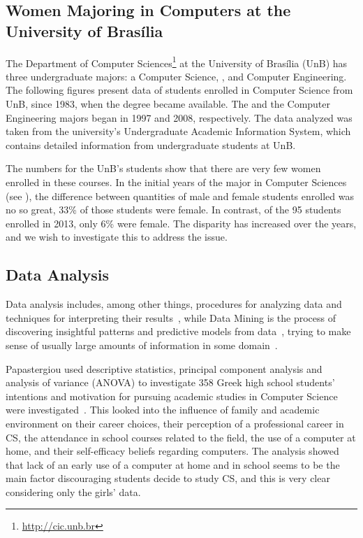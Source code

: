 \subsection{Women Majoring in Computers at the University of Brasília}

The Department of Computer Sciences\footnote{\url{http://cic.unb.br}} at the University of Brasília (UnB) has three undergraduate majors: a Computer Science, , and Computer Engineering. The following figures present data of students enrolled in Computer Science  from UnB, since 1983, when the degree became available. The   and the Computer Engineering majors  began in 1997 and 2008, respectively. The data analyzed was taken from the university's Undergraduate Academic Information System, which contains detailed information from undergraduate students at UnB.

The numbers for the UnB's students show that there are very few women enrolled in these courses. In the initial years of the major in Computer Sciences (see ), the difference between quantities of male and female students enrolled was no so great, 33\% of those students were female. In contrast, of the 95 students enrolled in 2013, only 6\% were female. The disparity has increased over the years, and we wish to investigate this to address the issue.

\subsection{Data Analysis}\label{sec:background:related}%

Data analysis includes, among other things, procedures for analyzing data and techniques for interpreting their results~\cite{Tukey1962}, while Data Mining is the process of discovering insightful patterns and predictive models from data~\cite{Zaki2014}, trying to make sense of usually large amounts of information in some domain~\cite{Cios2007}. 

Papastergiou used descriptive statistics, principal component analysis and analysis of variance (ANOVA) to investigate 358 Greek high school students' intentions and motivation for pursuing academic studies in Computer Science were investigated~\cite{papastergiou_are_2008}. This looked into the influence of family and academic environment on their career choices, their perception of a professional career in CS, the attendance in school courses related to the field, the use of a computer at home, and their self-efficacy beliefs regarding computers. The analysis showed that lack of an early use of a computer at home and in school seems to be the main factor discouraging students decide to study CS, and this is very clear considering only the girls' data.

